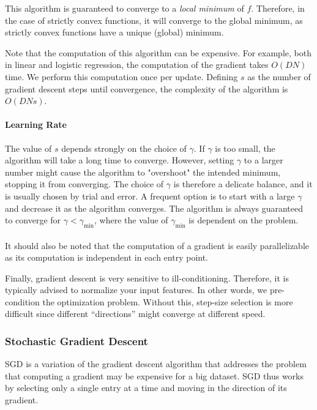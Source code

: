 \documentclass{article}
\begin{document}
This algorithm is guaranteed to converge to a \textit{local minimum} of $f$.
Therefore, in the case of strictly convex functions, it will converge to the global minimum, as strictly convex functions have a unique (global) minimum.

Note that the computation of this algorithm can be expensive. 
For example, both in linear and logistic regression, the computation of the gradient takes $O(DN)$ time.
We perform this computation once per update.
Defining $s$ as the number of gradient descent steps until convergence, the complexity of the algorithm is $O(DNs)$.

\paragraph{Learning Rate}
The value of $s$ depends strongly on the choice of $\gamma$.
If $\gamma$ is too small, the algorithm will take a long time to converge.
However, setting $\gamma$ to a larger number might cause the algorithm to "overshoot" the intended minimum, stopping it from converging.
The choice of $\gamma$ is therefore a delicate balance, and it is usually chosen by trial and error.
A frequent option is to start with a large $\gamma$ and decrease it as the algorithm converges.
The algorithm is always guaranteed to converge for $\gamma < \gamma_{\min}$, where the value of $\gamma_{\min}$ is dependent on the problem.

\paragraph{}
It should also be noted that the computation of a gradient is easily parallelizable as its computation is independent in each entry point.

Finally, gradient descent is very sensitive to ill-conditioning.
Therefore, it is typically advised to normalize your input features.
In other words, we pre-condition the optimization problem.
Without this, step-size selection is more difficult since different “directions” might converge at different speed.

\subsubsection{Stochastic Gradient Descent} 

SGD is a variation of the gradient descent algorithm that addresses the problem that computing a gradient may be expensive for a big dataset.
SGD thus works by selecting only a single entry at a time and moving in the direction of its gradient.  
\end{document}
